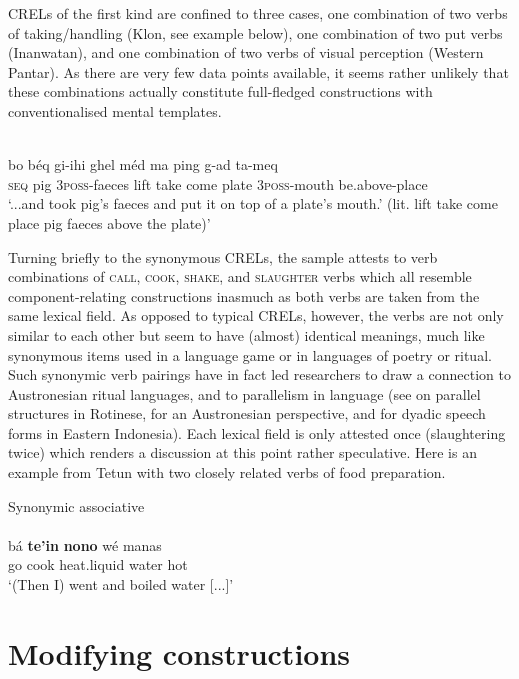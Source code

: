 CRELs of the first kind are confined to three cases, one combination of two verbs of taking/handling (Klon, see example below), one combination of two put verbs (Inanwatan), and one combination of two verbs of visual perception (Western Pantar). As there are very few data points available, it seems rather unlikely that these combinations actually constitute full-fledged constructions with conventionalised mental templates.

\ea 
{}\\
\gll bo béq gi-ihi ghel méd ma ping g-ad ta-meq \\
\textsc{seq} pig \textsc{3}\textsc{poss}-faeces lift take come plate \textsc{3}\textsc{poss}-mouth be.above-place \\
\glft `...and took pig's faeces and put it on top of a plate's mouth.' (lit. lift take come place pig faeces above the plate)'\\ 
\z

Turning briefly to the synonymous CRELs, the sample attests to verb combinations of \textsc{call}, \textsc{cook}, \textsc{shake}, and \textsc{slaughter} verbs which all resemble component-relating constructions inasmuch as both verbs are taken from the same lexical field. As opposed to typical CRELs, however, the verbs are not only similar to each other but seem to have (almost) identical meanings, much like synonymous items used in a language game or in languages of poetry or ritual. Such synonymic verb pairings have in fact led researchers to draw a connection to Austronesian ritual languages, and to parallelism in language (see \citealt{fox1971semantic} on parallel structures in Rotinese, \citealt{fox2005ritual} for an Austronesian perspective, and \citealt{fox2006speak} for dyadic speech forms in Eastern Indonesia). Each lexical field is only attested once (slaughtering twice) which renders a discussion at this point rather speculative. Here is an example from Tetun with two closely related verbs of food preparation.

\ea Synonymic associative  \\
\\
\gll bá \textbf{te'in} \textbf{nono} wé manas \\
go cook heat.liquid water hot \\
\glft `(Then I) went and boiled water [...]'\\ 
\z

\section{Modifying constructions}\label{sec:modifying}

